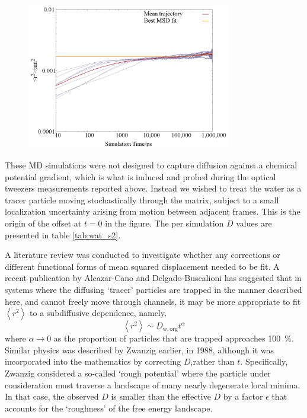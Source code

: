 \begin{figure}
    \centering
    \includegraphics[width=0.8\textwidth]{chapters/water_hopping/figures/Fig_S7.png}
    \label{fig:wat_s7}
\end{figure}

These MD simulations were not designed to capture diffusion against a chemical potential gradient, which is what is induced and probed during the optical tweezers measurements reported above. Instead we wished to treat the water as a tracer particle moving stochastically through the matrix, subject to a small localization uncertainty arising from motion between adjacent frames.\cite{michaletMeanSquareDisplacement2010} This is the origin of the offset at $t=0$ in the figure. The per simulation $D$ values are presented in table \ref{tab:wat_s2}. 

A literature review was conducted to investigate whether any corrections or different functional forms of mean squared displacement needed to be fit. A recent publication \cite{alcazar-canoGeneralPhenomenologicalRelation2018} by Alcazar-Cano and Delgado-Buscalioni has suggested that in systems where the diffusing `tracer’ particles are trapped in the manner described here, and cannot freely move through channels, it may be more appropriate to fit $\left\langle r^{2}\right\rangle$ to a subdiffusive dependence, namely, 
\begin{equation}
\left\langle r^{2}\right\rangle \sim D_{\mathrm{w, org}} t^{\alpha}
\end{equation}
where $\alpha \rightarrow 0$ as the proportion of particles that are trapped approaches \SI{100}{\percent}. Similar physics was described by Zwanzig earlier, in 1988, \cite{zwanzigDiffusionRoughPotential1988} although it was incorporated into the mathematics by correcting $D$,rather than $t$. Specifically, Zwanzig considered a so-called `rough potential' where the particle under consideration must traverse a landscape of many nearly degenerate local minima. In that case, the observed $D$ is smaller than the effective $D$ by a factor $\epsilon$ that accounts for the `roughness' of the free energy landscape.

